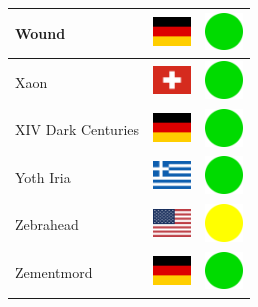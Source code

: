\documentclass[12pt, a4paper, twoside]{report}
\begin{document}
\begin{center}
\begin{longtable}{|p{5cm}|p{2cm}|p{2cm}|}
 Wound                                                      & \includegraphics[width=1cm]{../img/flags/de} &   \includegraphics[width=1cm]{../likes/y} \\ \hline
 Xaon                                                       & \includegraphics[width=1cm]{../img/flags/ch} &   \includegraphics[width=1cm]{../likes/y} \\ \hline
 XIV Dark Centuries                                         & \includegraphics[width=1cm]{../img/flags/de} &   \includegraphics[width=1cm]{../likes/y} \\ \hline
 Yoth Iria                                                  & \includegraphics[width=1cm]{../img/flags/gr} &   \includegraphics[width=1cm]{../likes/y} \\ \hline
 Zebrahead                                                  & \includegraphics[width=1cm]{../img/flags/us} &   \includegraphics[width=1cm]{../likes/m} \\ \hline
 Zementmord                                                 & \includegraphics[width=1cm]{../img/flags/de} &   \includegraphics[width=1cm]{../likes/y} \\ \hline

\end{longtable}
\end{center}
\end{document}
